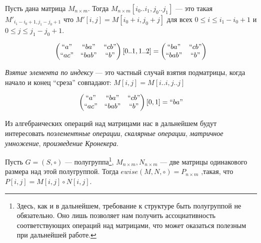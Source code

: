 \begin{definition}
Пусть дана матрица $M_{n\times m}$. Тогда
$
M_{n\times m}[i_0..i_1,j_0..j_1]
$
 --- это такая $M'_{i_1 - i_0 + 1, j_1 - j_0 + 1}$ что $M'[i,j] = M[i_0 + i,j_0 + j]$ для всех $0\leq i \leq i_1 - i_0 + 1$ и $0\leq j \leq j_1 - j_0 + 1$.
\end{definition}


\begin{example}
$$
\begin{pmatrix}
``a"  & ``ba"  & ``cb" \\
``ac" & ``bab" & ``b"  \\
\end{pmatrix}[0..1,1..2] =
\begin{pmatrix}
``ba"  & ``cb" \\
``bab" & ``b"  \\
\end{pmatrix}
$$
\end{example}


\begin{definition}
\emph{Взятие элемента по индексу} --- это частный случай взятия подматрицы, когда начало и конец ``среза'' совпадают:
$
M[i,j] = M[i..i,j..j]
$
\end{definition}

\begin{example}
$$
\begin{pmatrix}
``a"  & ``ba"  & ``cb" \\
``ac" & ``bab" & ``b"  \\
\end{pmatrix}[0,1] = ``ba"
$$
\end{example}

Из алгебраических операций над матрицами нас в дальнейшем будут интересовать \textit{поэлементные операции}, \textit{скалярные операции}, \textit{матричное умножение}, \textit{произведение Кронекера}.


\begin{definition}

Пусть $G = (S,\circ)$ --- полугруппа\footnote{Здесь, как и в дальнейшем, требование к структуре быть полугруппой не обязательно. Оно лишь позволяет нам получить ассоциативность соответствующих операций над матрицами, что может оказаться полезным при дальнейшей работе.}, $M_{n \times m}, N_{n\times m}$ --- две матрицы одинакового размера над этой полугруппой.
Тогда
$
ewise(M,N,\circ) = P_{n \times m}
$
,такая, что $P[i,j] = M[i,j] \circ N[i,j]$.
\end{definition}



